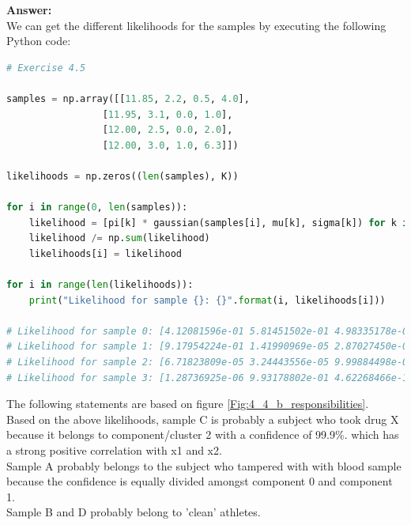 \documentclass[a4paper]{article}
\begin{document}
\textbf{Answer:}\\

We can get the different likelihoods for the samples by executing the following Python code:

\begin{lstlisting}[language=Python]
# Exercise 4.5

samples = np.array([[11.85, 2.2, 0.5, 4.0],
                 [11.95, 3.1, 0.0, 1.0],
                 [12.00, 2.5, 0.0, 2.0],
                 [12.00, 3.0, 1.0, 6.3]])

likelihoods = np.zeros((len(samples), K))

for i in range(0, len(samples)):
    likelihood = [pi[k] * gaussian(samples[i], mu[k], sigma[k]) for k in range(0, K)]
    likelihood /= np.sum(likelihood)
    likelihoods[i] = likelihood

for i in range(len(likelihoods)):
    print("Likelihood for sample {}: {}".format(i, likelihoods[i]))
    
# Likelihood for sample 0: [4.12081596e-01 5.81451502e-01 4.98335178e-04 5.96856647e-03]
# Likelihood for sample 1: [9.17954224e-01 1.41990969e-05 2.87027450e-05 8.20028744e-02]
# Likelihood for sample 2: [6.71823809e-05 3.24443556e-05 9.99884498e-01 1.58757605e-05]
# Likelihood for sample 3: [1.28736925e-06 9.93178802e-01 4.62268466e-12 6.81991031e-03]
\end{lstlisting}

The following statements are based on figure \ref{Fig:4_4_b_responsibilities}.\\

Based on the above likelihoods, sample C is probably a subject who took drug X because it belongs to component/cluster 2 with a confidence of 99.9\%. which has a strong positive correlation with x1 and x2.\\
Sample A probably belongs to the subject who tampered with with blood sample because the confidence is equally divided amongst component 0 and component 1. \\
Sample B and D probably belong to 'clean' athletes.
\end{document}
